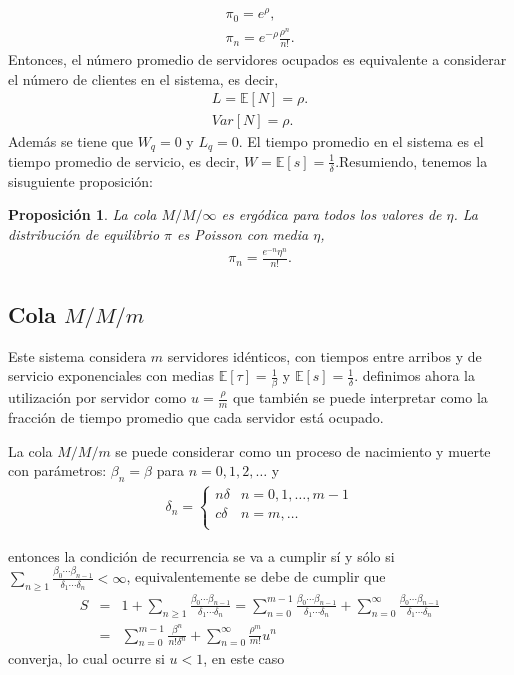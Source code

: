 \documentclass{article}
\newtheorem{Prop}{Proposición}
\newcommand{\esp}{\mathbb{E}}
\begin{document}
\begin{eqnarray}\label{MMinf.pi}
\pi_{0}=e^{\rho},\\
\pi_{n}=e^{-\rho}\frac{\rho^{n}}{n!}.
\end{eqnarray}
Entonces, el n\'umero promedio de servidores ocupados es equivalente a considerar el n\'umero de clientes en el  sistema, es decir,
\begin{eqnarray}
L=\esp\left[N\right]=\rho.\\
Var\left[N\right]=\rho.
\end{eqnarray}
Adem\'as se tiene que $W_{q}=0$ y $L_{q}=0$. El tiempo promedio en el sistema es el tiempo promedio de servicio, es decir, $W=\esp\left[s\right]=\frac{1}{\delta}$.Resumiendo, tenemos la sisuguiente proposici\'on:

\begin{Prop}
La cola $M/M/\infty$ es erg\'odica para todos los valores de $\eta$. La distribuci\'on de equilibrio $\pi$ es Poisson con media $\eta$,
\begin{eqnarray}
\pi_{n}=\frac{e^{-n}\eta^{n}}{n!}.
\end{eqnarray}
\end{Prop}
%
\subsection{Cola $M/M/m$}
%

Este sistema considera $m$ servidores id\'enticos, con tiempos entre arribos y de servicio exponenciales con medias $\esp\left[\tau\right]=\frac{1}{\beta}$ y
$\esp\left[s\right]=\frac{1}{\delta}$. definimos ahora la utilizaci\'on por servidor como $u=\frac{\rho}{m}$ que tambi\'en se puede interpretar como la fracci\'on de tiempo promedio que cada servidor est\'a ocupado.

La cola $M/M/m$ se puede considerar como un proceso de nacimiento y muerte con par\'ametros: $\beta_{n}=\beta$ para $n=0,1,2,\ldots$ y
\begin{eqnarray}
\delta_{n}=\left\{\begin{array}{cc}
n\delta & n=0,1,\ldots,m-1\\
c\delta & n=m,\ldots\\
\end{array}\right.
\end{eqnarray}

entonces  la condici\'on de recurrencia se va a cumplir s\'i y s\'olo si $\sum_{n\geq1}\frac{\beta_{0}\cdots\beta_{n-1}}{\delta_{1}\cdots\delta_{n}}<\infty$,
equivalentemente se debe de cumplir que
\begin{eqnarray*}
S&=&1+\sum_{n\geq1}\frac{\beta_{0}\cdots\beta_{n-1}}{\delta_{1}\cdots\delta_{n}}=\sum_{n=0}^{m-1}\frac{\beta_{0}\cdots\beta_{n-1}}{\delta_{1}\cdots\delta_{n}}+\sum_{n=0}^{\infty}\frac{\beta_{0}\cdots\beta_{n-1}}{\delta_{1}\cdots\delta_{n}}\\
&=&\sum_{n=0}^{m-1}\frac{\beta^{n}}{n!\delta^{n}}+\sum_{n=0}^{\infty}\frac{\rho^{m}}{m!}u^{n}
\end{eqnarray*}
converja, lo cual ocurre si $u<1$, en este caso
\end{document}
